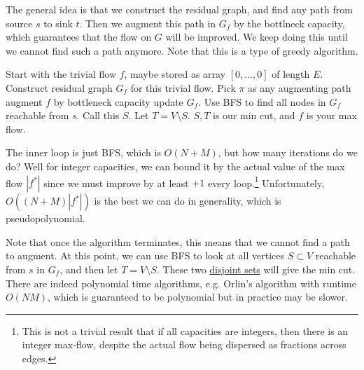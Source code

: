   \begin{algo}
    The general idea is that we construct the residual graph, and find any path from source $s$ to sink $t$. Then we augment this path in $G_f$ by the bottlneck capacity, which guarantees that the flow on $G$ will be improved. We keep doing this until we cannot find such a path anymore. Note that this is a type of greedy algorithm. 

    \begin{algorithm}[H]
      \label{alg:maxflow}
      \begin{algorithmic}
        \State 
        \State Start with the trivial flow $f$, maybe stored as array $[0, \ldots, 0]$ of length $E$. 
          \State Construct residual graph $G_f$ for this trivial flow. 
           
            \State Pick $\pi$ as any augmenting path 
            \State augment $f$ by bottleneck capacity 
            \State update $G_f$. 
          \EndWhile
          \State {}  
          \State Use BFS to find all nodes in $G_f$ reachable from $s$. Call this $S$.  
          \State Let $T = V \setminus S$.  
          \State $S, T$ is our min cut, and $f$ is your max flow. 
        \EndFunction
      \end{algorithmic}
    \end{algorithm}
    The inner loop is just BFS, which is $O(N + M)$, but how many iterations do we do? Well for integer capacities, we can bound it by the actual value of the max flow $|f^\ast|$ since we must improve by at least $+1$ every loop.\footnote{This is not a trivial result that if all capacities are integers, then there is an integer max-flow, despite the actual flow being dispersed as fractions across edges.} Unfortunately, $O((N+M) |f^\ast|)$ is the best we can do in generality, which is pseudopolynomial. 
  \end{algo}

  Note that once the algorithm terminates, this means that we cannot find a path to augment. At this point, we can use BFS to look at all vertices $S \subset V$ reachable from $s$ in $G_f$, and then let $T = V \setminus S$. These two \hyperref[st-def:disjoint-sets]{disjoint sets} will give the min cut. There are indeed polynomial time algorithms, e.g. Orlin's algorithm with runtime $O(NM)$, which is guaranteed to be polynomial but in practice may be slower. 

